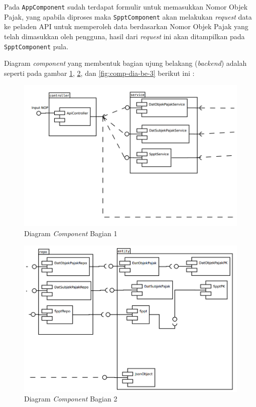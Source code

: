 \documentclass[pdftex,12pt, oneside]{article}
\begin{document}
Pada \texttt{AppComponent} sudah terdapat formulir untuk memasukkan Nomor Objek Pajak, yang apabila diproses maka \texttt{SpptComponent} akan melakukan \textit{request} data ke peladen API untuk memperoleh data berdasarkan Nomor Objek Pajak yang telah dimasukkan oleh pengguna, hasil dari \textit{request} ini akan ditampilkan pada \texttt{SpptComponent} pula.

Diagram \textit{component} yang membentuk bagian ujung belakang (\textit{backend}) adalah seperti pada gambar \ref{fig:comp-dia-be-1}, \ref{fig:comp-dia-be-2}, dan \ref{fig:comp-dia-be-3} berikut ini :

\begin{figure}[H]
	\centering
	\includegraphics[width=1\textwidth]{./resources/comp-dia-backend-1}
	\caption{Diagram \textit{Component} Bagian 1}
	\label{fig:comp-dia-be-1}
\end{figure}

\begin{figure}[H]
	\centering
	\includegraphics[width=1\textwidth]{./resources/comp-dia-backend-2}
	\caption{Diagram \textit{Component} Bagian 2}
	\label{fig:comp-dia-be-2}
\end{figure}
\end{document}
